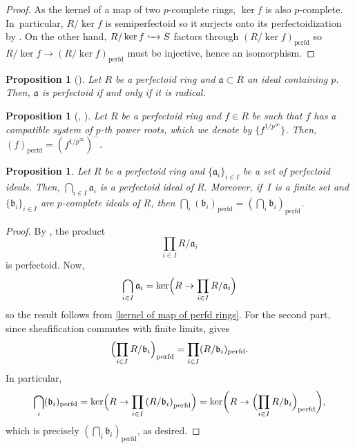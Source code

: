 \documentclass[11pt]{article}
\let\autoref\cref
\theoremstyle{plain}
\newtheorem{proposition}[theorem]{Proposition}
\theoremstyle{definition}
\numberwithin{equation}{theorem}
\newcommand{\fra}{\mathfrak{a}}
\newcommand{\frab}{\mathfrak{b}}
\newcommand{\perfd}{_{\mathrm{perfd}}}
\newcommand{\into}[1][]{\lhook \joinrel \xrightarrow{\ #1\ }}
\newcommand{\unpfty}{{1/p^\infty}}
\begin{document}
\begin{proof}
As the kernel of a map of two $p$-complete rings, $\ker f$ is also $p$-complete. In~particular, $R/\ker f$ is semiperfectoid so it surjects onto its perfectoidization by \cite[Th.\,7.4]{BhattScholzePrisms}. On the other hand, $R/\ker f\into S$ factors through $(R/\ker f)\perfd$ so $R/\ker f\to (R/\ker f)\perfd$ must be injective, hence an isomorphism.
\end{proof}

\begin{proposition}[{\cite[Prop.\,2.8]{DineIshizukaTiltingUntilting}}]\label{perfectoidization is radical when p in ideal}
Let $R$ be a perfectoid ring and $\fra\subset R$ an ideal containing $p$. Then, $\fra$ is perfectoid if and only if it is radical.
\end{proposition}

\begin{proposition}[{\cite[Ex.\,7.9]{BhattScholzePrisms}, \cite[Lem.\,2.4.3]{CaiLeeMaSchwedeTuckerPerfectoidSignature}}]\label{perfectoidization of principal ideal with roots}
Let $R$ be a perfectoid ring and $f\in R$ be such that $f$ has a compatible system of $p$-th power roots, which we denote by $\{f^{1/{p^\infty}}\}$. Then, $(f)\perfd=(f^\unpfty)^{-}$.
\end{proposition}

\begin{proposition}\label{intersection of perfectoid ideals is perfectoid}
Let $R$ be a perfectoid ring and $\{\fra_i\}_{i\in I}$ be a set of perfectoid ideals. Then, $\bigcap_{i\in I} \fra_i$ is a perfectoid ideal of $R$.
Moreover, if~$I$ is a finite set and $\{\frab_i\}_{i\in I}$ are $p$-complete ideals of $R$, then $\bigcap_i (\frab_i)\perfd=(\bigcap_i \frab_i)\perfd$.
\end{proposition}

\begin{proof}
By \cite[Ex.\,3.8\,(8)]{BhattIyengarMaRegularRings}, the product
\[
\prod_{i\in I}R/\fra_i
\]
is perfectoid. Now,
\[
\bigcap_{i\in I} \fra_i=\ker \Bigl( R\to \prod_{i\in I}R/\fra_i\Bigr)
\]
so the result follows from \autoref{kernel of map of perfd rings}.
For the second part, since sheafification commutes with finite limits, \cite[Cor.\,8.11]{BhattScholzePrisms} gives
\[
\Bigl(\prod_{i\in I} R/\frab_i\Bigr)\perfd=\prod_{i\in I}( R/\frab_i)\perfd.
\]
In particular,
\[
\bigcap_i (\frab_i)\perfd=\ker\Bigl( R\to \prod_{i\in I} \left( R/\frab_i\right)\perfd \Bigr)= \ker \biggl( R\to \Bigl(\prod_{i\in I} R/\frab_i\Bigr)\perfd\biggr),
\]
which is precisely $\left(\bigcap_i \frab_i\right)\perfd$, as desired.
\end{proof}
\end{document}

